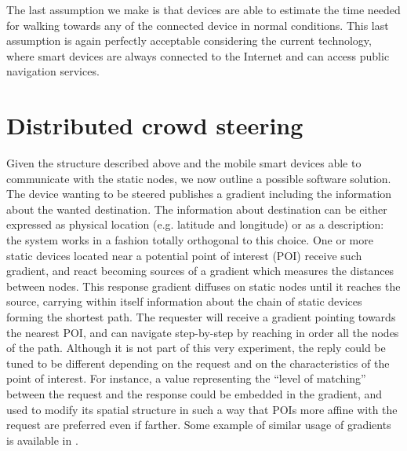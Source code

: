 \documentclass[12pt,a4paper,twoside,openright]{book}
\begin{document}
The last assumption we make is that devices are able to estimate the time needed for walking towards any of the connected device in normal conditions.
%
This last assumption is again perfectly acceptable considering the current technology, where smart devices are always connected to the Internet and can access public navigation services.

\section{Distributed crowd steering}

Given the structure described above and the mobile smart devices able to communicate with the static nodes, we now outline a possible software solution.
%
The device wanting to be steered publishes a gradient including the information about the wanted destination.
%
The information about destination can be either expressed as physical location (e.g. latitude and longitude) or as a description: the system works in a fashion totally orthogonal to this choice.
%
One or more static devices located near a potential point of interest (POI) receive such gradient, and react becoming sources of a gradient which measures the distances between nodes.
%
This response gradient diffuses on static nodes until it reaches the source, carrying within itself information about the chain of static devices forming the shortest path.
%
The requester will receive a gradient pointing towards the nearest POI, and can navigate step-by-step by reaching in order all the nodes of the path.
%
Although it is not part of this very experiment, the reply could be tuned to be different depending on the request and on the characteristics of the point of interest.
%
For instance, a value representing the ``level of matching'' between the request and the response could be embedded in the gradient, and used to modify its spatial structure in such a way that POIs more affine with the request are preferred even if farther.
%
Some example of similar usage of gradients is available in \cite{SemMatchingSAC2013}.
\end{document}
